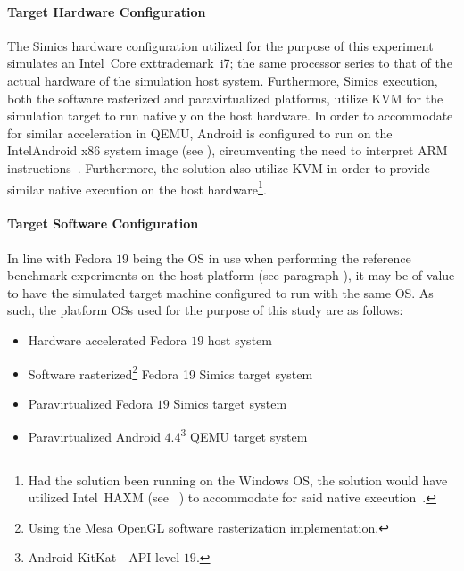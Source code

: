 \paragraph{Target Hardware Configuration}
\label{par:experimentalmethodology_platformconfiguration:targethardwareconfiguration}
The Simics hardware configuration utilized for the purpose of this experiment simulates an Intel\circledR\ Core	exttrademark\ i7; the same processor series to that of the actual hardware of the simulation host system.
Furthermore, Simics execution, both the software rasterized and paravirtualized platforms, utilize KVM for the simulation target to run natively on the host hardware.
In order to accommodate for similar acceleration in QEMU, Android is configured to run on the Intel\circledR Android x86 system image (see ), circumventing the need to interpret ARM instructions~.
Furthermore, the solution also utilize KVM in order to provide similar native execution on the host hardware\footnote{Had the solution been running on the Windows OS, the solution would have utilized Intel\circledR\ HAXM (see ~) to accommodate for said native execution~.}.

\paragraph{Target Software Configuration}
\label{par:experimentalmethodology_platformconfiguration_targetsoftwareconfiguration}
In line with Fedora $19$ being the OS in use when performing the reference benchmark experiments on the host platform (see paragraph ), it may be of value to have the simulated target machine configured to run with the same OS.
As such, the platform OSs used for the purpose of this study are as follows:
\begin{itemize}[noitemsep]
\item Hardware accelerated Fedora $19$ host system
\item Software rasterized\footnote{Using the Mesa OpenGL software rasterization implementation.} Fedora 19 Simics target system
\item Paravirtualized Fedora $19$ Simics target system
\item Paravirtualized Android $4.4$\footnote{Android KitKat - API level $19$.} QEMU target system
\end{itemize}

